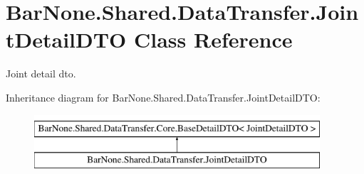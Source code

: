 \hypertarget{class_bar_none_1_1_shared_1_1_data_transfer_1_1_joint_detail_d_t_o}{}\section{Bar\+None.\+Shared.\+Data\+Transfer.\+Joint\+Detail\+D\+TO Class Reference}
\label{class_bar_none_1_1_shared_1_1_data_transfer_1_1_joint_detail_d_t_o}


Joint detail dto.  


Inheritance diagram for Bar\+None.\+Shared.\+Data\+Transfer.\+Joint\+Detail\+D\+TO\+:\begin{figure}[H]
\begin{center}
\leavevmode
\includegraphics[height=2.000000cm]{class_bar_none_1_1_shared_1_1_data_transfer_1_1_joint_detail_d_t_o}
\end{center}
\end{figure}

